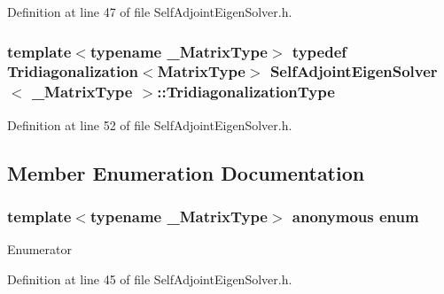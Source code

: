 Definition at line 47 of file Self\-Adjoint\-Eigen\-Solver.\-h.

\hypertarget{class_self_adjoint_eigen_solver_ac288a7aa494c8479c2783c48304fa928}{
\subsubsection[{Tridiagonalization\-Type}]{\setlength{\rightskip}{0pt plus 5cm}template$<$typename \-\_\-\-Matrix\-Type$>$ typedef {\bf Tridiagonalization}$<${\bf Matrix\-Type}$>$ {\bf Self\-Adjoint\-Eigen\-Solver}$<$ \-\_\-\-Matrix\-Type $>$\-::{\bf Tridiagonalization\-Type}}}\label{class_self_adjoint_eigen_solver_ac288a7aa494c8479c2783c48304fa928}


Definition at line 52 of file Self\-Adjoint\-Eigen\-Solver.\-h.



\subsection{Member Enumeration Documentation}
\hypertarget{class_self_adjoint_eigen_solver_ad7b283bbf2a83c2e4e488922b6c17e4e}{\subsubsection[{anonymous enum}]{\setlength{\rightskip}{0pt plus 5cm}template$<$typename \-\_\-\-Matrix\-Type$>$ anonymous enum}}\label{class_self_adjoint_eigen_solver_ad7b283bbf2a83c2e4e488922b6c17e4e}
\begin{Desc}
\item[Enumerator]\par
\begin{description}
\item[{\em 
\hypertarget{class_self_adjoint_eigen_solver_ad7b283bbf2a83c2e4e488922b6c17e4eabca9de2fa1974b39de30121c2be6e67a}{Size}\label{class_self_adjoint_eigen_solver_ad7b283bbf2a83c2e4e488922b6c17e4eabca9de2fa1974b39de30121c2be6e67a}
}]\end{description}
\end{Desc}


Definition at line 45 of file Self\-Adjoint\-Eigen\-Solver.\-h.



